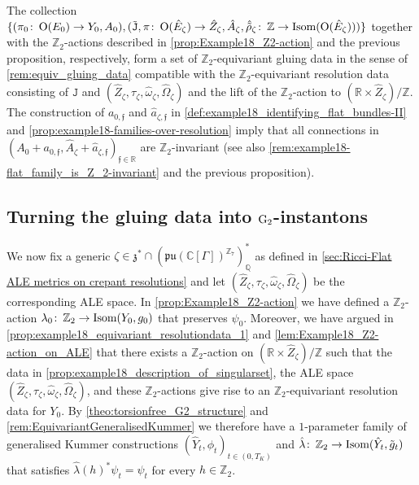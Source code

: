 \documentclass[11pt,a4paper]{scrartcl}
\newcommand{\col}{\colon \thinspace}
\newcommand{\G}{\textup{G}}
\renewcommand{\O}{\textup{O}}
\numberwithin{equation}{section}
\theoremstyle{plain}
\theoremstyle{definition}
\theoremstyle{remark}
\begin{document}
\begin{proposition}\label{prop:example18_equivariant_gluing-data}
The collection $\{(\pi_0 \col \O(E_0)\to Y_0, A_0),(\tilde{\mathtt{J}},\pi\col \O(\hat{E}_\zeta) \to \hat{Z}_\zeta,\hat{A}_\zeta,\hat{\tilde{\rho}}_\zeta\col \mathbb{Z}\to \textup{Isom}(\O(\hat{E}_\zeta)))\}$ together with the $\mathbb{Z}_2$-actions described in \autoref{prop:Example18_Z2-action} and the previous proposition, respectively, form a set of $\mathbb{Z}_2$-equivariant gluing data in the sense of \autoref{rem:equiv_gluing_data} compatible with the $\mathbb{Z}_2$-equivariant resolution data consisting of $\mathtt{J}$ and $(\hat{Z}_\zeta,\tau_\zeta,\hat{\omega}_\zeta,\hat{\Omega}_\zeta)$ and the lift of the $\mathbb{Z}_2$-action to $(\mathbb{R}\times\hat{Z}_\zeta)/\mathbb{Z}$. The construction of $a_{0,\mathfrak{f}}$ and $\hat{a}_{\zeta,\mathfrak{f}}$ in \autoref{def:example18_identifying_flat_bundles-II} and \autoref{prop:example18-families-over-resolution} imply that all connections in $(A_0+a_{0,\mathfrak{f}},\hat{A}_\zeta+\hat{a}_{\zeta,\mathfrak{f}})_{\mathfrak{f}\in \mathbb{R}}$ are $\mathbb{Z}_2$-invariant (see also \autoref{rem:example18-flat_family_is_Z_2-invariant} and the previous proposition).
\end{proposition} 

\subsection{Turning the gluing data into $\G_2$-instantons}

We now fix a generic $\zeta \in \mathfrak{z}^* \cap (\mathfrak{pu}(\mathbb{C}[\Gamma])^{\mathbb{Z}_7})_\mathbb{Q}^*$ as defined in \autoref{sec:Ricci-Flat ALE metrics on crepant resolutions} and let $(\hat{Z}_\zeta,\tau_\zeta,\hat{\omega}_\zeta,\hat{\Omega}_\zeta)$ be the corresponding ALE space. In \autoref{prop:Example18_Z2-action} we have defined a $\mathbb{Z}_2$-action $\lambda_0 \col \mathbb{Z}_2 \to \textup{Isom}(Y_0,g_0)$ that preserves $\psi_0$. Moreover, we have argued in \autoref{prop:example18_equivariant_resolutiondata_1} and \autoref{lem:Example18_Z2-action_on_ALE} that there exists a $\mathbb{Z}_2$-action on $(\mathbb{R}\times \hat{Z}_\zeta)/\mathbb{Z}$ such that the data in \autoref{prop:example18_description_of_singularset}, the ALE space $(\hat{Z}_\zeta,\tau_\zeta,\hat{\omega}_\zeta,\hat{\Omega}_\zeta)$, and these $\mathbb{Z}_2$-actions give rise to an $\mathbb{Z}_2$-equivariant resolution data for $Y_0$. By \autoref{theo:torsionfree_G2_structure} and \autoref{rem:EquivariantGeneralisedKummer} we therefore have a $1$-parameter family of generalised Kummer constructions $(\hat{Y}_t,\phi_t)_{t\in(0,T_K)}$ and $\hat{\lambda}\col \mathbb{Z}_2 \to \textup{Isom}(\hat{Y}_t,\tilde{g}_t)$ that satisfies $\hat{\lambda}(h)^*\psi_t=\psi_t$ for every $h\in \mathbb{Z}_2$.
\end{document}
